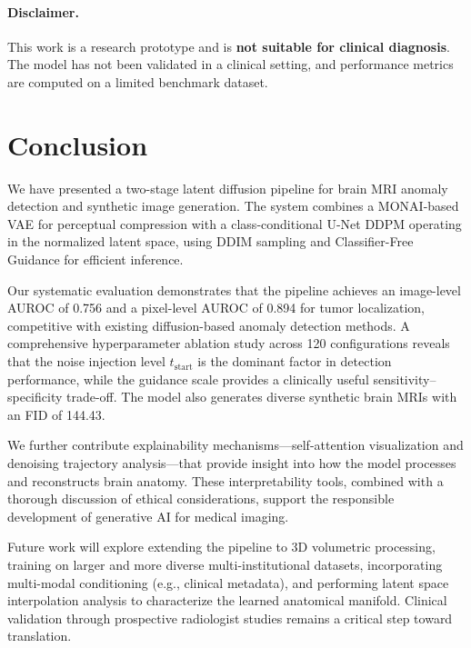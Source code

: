 \paragraph{Disclaimer.} This work is a research prototype and is \textbf{not suitable for clinical diagnosis}. The model has not been validated in a clinical setting, and performance metrics are computed on a limited benchmark dataset.

\section{Conclusion}
\label{sec:conclusion}

We have presented a two-stage latent diffusion pipeline for brain MRI anomaly detection and synthetic image generation. The system combines a MONAI-based VAE for perceptual compression with a class-conditional U-Net DDPM operating in the normalized latent space, using DDIM sampling and Classifier-Free Guidance for efficient inference.

Our systematic evaluation demonstrates that the pipeline achieves an image-level AUROC of 0.756 and a pixel-level AUROC of 0.894 for tumor localization, competitive with existing diffusion-based anomaly detection methods. A comprehensive hyperparameter ablation study across 120 configurations reveals that the noise injection level $t_{\text{start}}$ is the dominant factor in detection performance, while the guidance scale provides a clinically useful sensitivity--specificity trade-off. The model also generates diverse synthetic brain MRIs with an FID of 144.43.

We further contribute explainability mechanisms---self-attention visualization and denoising trajectory analysis---that provide insight into how the model processes and reconstructs brain anatomy. These interpretability tools, combined with a thorough discussion of ethical considerations, support the responsible development of generative AI for medical imaging.

Future work will explore extending the pipeline to 3D volumetric processing, training on larger and more diverse multi-institutional datasets, incorporating multi-modal conditioning (e.g., clinical metadata), and performing latent space interpolation analysis to characterize the learned anatomical manifold. Clinical validation through prospective radiologist studies remains a critical step toward translation.

